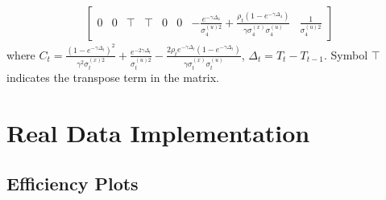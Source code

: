 \begin{landscape}
\begin{align*}
\begin{bmatrix}
  0 & 0 & \top&\top& 0 & 0 & -\frac{e^{-\gamma\Delta_4}}{\sigma_4^{\left(u\right)2}}+\frac{\rho_{t}\left(1-e^{-\gamma\Delta_4}\right)}{\gamma\sigma_4^{\left(x\right)}\sigma_4^{\left(u\right)}}  & \frac{1}{\sigma_4^{\left(u\right)2}}
\end{bmatrix}
\end{align*}
\normalsize
where $C_t = \frac{ \left(1-e^{-\gamma\Delta_t}\right)^2 }{\gamma^2\sigma_t^{\left(x\right)2}}  + \frac{ e^{-2\gamma\Delta_t}}{\sigma_t^{\left(u\right)2}} - \frac{2\rho_{t} e^{-\gamma\Delta_t} \left(1-e^{-\gamma\Delta_t}\right) }{ \gamma \sigma_t^{\left(x\right)}\sigma_t^{\left(u\right)}}$, $\Delta_t = T_t-T_{t-1}$. Symbol $\top$ indicates the transpose term in the matrix. 
\end{landscape}

\clearpage


\section{Real Data Implementation}

\subsection*{Efficiency Plots}


